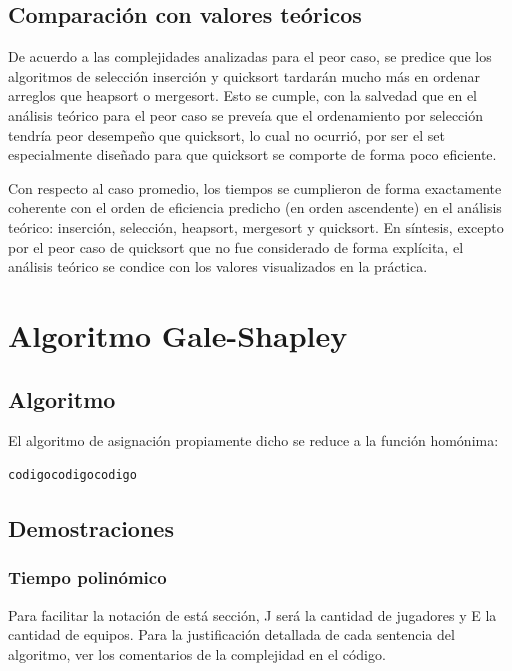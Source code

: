 \documentclass[titlepage,a4paper]{article}
\begin{document}
\subsection{Comparación con valores teóricos}

De acuerdo a las complejidades analizadas para el peor caso, se predice que los algoritmos de selección inserción y quicksort tardarán mucho más en ordenar arreglos que heapsort o mergesort. Esto se cumple, con la salvedad que en el análisis teórico para el peor caso se preveía que el ordenamiento por selección tendría peor desempeño que quicksort, lo cual no ocurrió, por ser el set especialmente diseñado para que quicksort se comporte de forma poco eficiente.

Con respecto al caso promedio, los tiempos se cumplieron de forma exactamente coherente con el orden de eficiencia predicho (en orden ascendente) en el análisis teórico: inserción, selección, heapsort, mergesort y quicksort. En síntesis, excepto por el peor caso de quicksort que no fue considerado de forma explícita, el análisis teórico se condice con los valores visualizados en la práctica.






\section{Algoritmo Gale-Shapley}

\subsection{Algoritmo}

El algoritmo de asignación propiamente dicho se reduce a la función homónima:

\begin{verbatim}
codigocodigocodigo
\end{verbatim}

\subsection{Demostraciones}

\subsubsection{Tiempo polinómico}

Para facilitar la notación de está sección, J será la cantidad de jugadores y E la cantidad de equipos. Para la justificación detallada de cada sentencia del algoritmo, ver los comentarios de la complejidad en el código.
\end{document}
